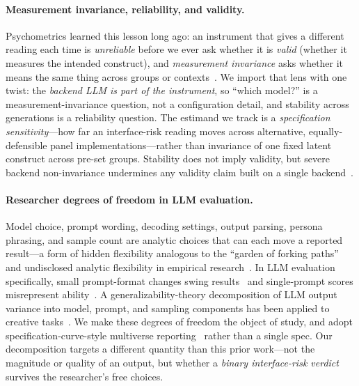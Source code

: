 \documentclass[manuscript,review,anonymous]{acmart}
\begin{document}
\paragraph{Measurement invariance, reliability, and validity.} Psychometrics learned this lesson long ago:
an instrument that gives a different reading each time is \emph{unreliable} before we ever ask whether it
is \emph{valid} (whether it measures the intended construct), and \emph{measurement invariance} asks
whether it means the same thing across groups or contexts~\cite{santurkar2023whose,tjuatja2024llms}. We
import that lens with one twist: the \emph{backend LLM is part of the instrument}, so ``which model?'' is a
measurement-invariance question, not a configuration detail, and stability across generations is a
reliability question. The estimand
we track is a \emph{specification sensitivity}---how far an interface-risk reading moves across alternative,
equally-defensible panel implementations---rather than invariance of one fixed latent construct across
pre-set groups. Stability does
not imply validity, but severe backend non-invariance undermines any validity claim built on a single
backend~\cite{dominguez2024questioning}.

\paragraph{Researcher degrees of freedom in LLM evaluation.} Model choice, prompt wording, decoding
settings, output parsing, persona phrasing, and sample count are analytic choices that can each move a
reported result---a form of hidden flexibility analogous to the ``garden of forking paths'' and
undisclosed analytic flexibility in empirical research~\cite{simmons2011false}. In LLM evaluation
specifically, small prompt-format changes swing results~\cite{sclar2024quantifying} and single-prompt
scores misrepresent ability~\cite{mizrahi2024state}. A generalizability-theory decomposition of LLM output
variance into model, prompt, and sampling components has been applied to creative
tasks~\cite{haase2026within}. We make these degrees of freedom the object of study,
and adopt specification-curve-style multiverse reporting~\cite{simonsohn2020specification} rather than a
single spec. Our decomposition targets a different quantity than this prior work---not the magnitude or
quality of an output, but whether a \emph{binary interface-risk verdict} survives the researcher's free
choices.
\end{document}
